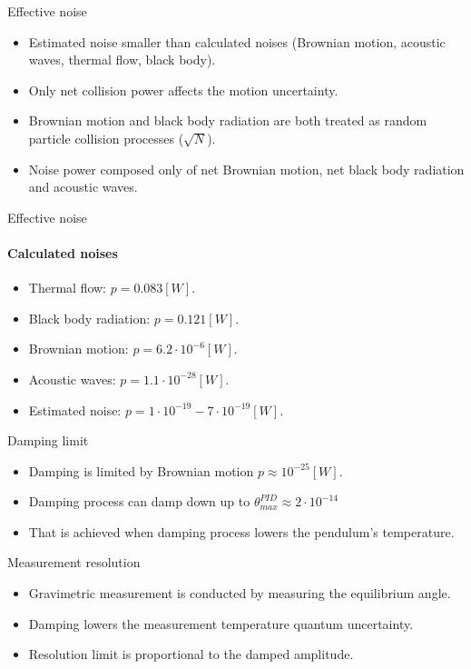 \documentclass{beamer}
\begin{document}
\begin{frame}{Effective noise}
	
	\begin{itemize}	
		\item Estimated noise smaller than calculated noises (Brownian motion, acoustic waves, thermal flow, black body).
		\item Only net collision power affects the motion uncertainty.
		\item Brownian motion and black body radiation are both treated as random particle collision processes ($\sqrt{N}$).
		\item Noise power composed only of net Brownian motion, net black body radiation and acoustic waves.  	 
					
	\end{itemize}
\end{frame}

\begin{frame}{Effective noise}
	\framesubtitle{Calculated noises}
	\begin{itemize}	
		\item Thermal flow: $p=0.083[W]$.
		\item Black body radiation: $p=0.121[W]$.
		\item Brownian motion: $p=6.2\cdot 10^{-6}[W]$.
		\item Acoustic waves: $p=1.1\cdot 10^{-28}[W]$.
		\pause
		\item Estimated noise: $p=1\cdot 10^{-19} - 7\cdot 10^{-19}[W]$.
					
	\end{itemize}
\end{frame}
\begin{frame}{Damping limit}
	
	\begin{itemize}	 
		\item Damping is limited by Brownian motion $p\approx 10^{-25}  [W]$.
		\item Damping process can damp down up to $\theta_{max}^{PID}\approx 2\cdot 10^{-14}$
		\item That is achieved when damping process lowers the pendulum's temperature.  				
	\end{itemize}
\end{frame}
\begin{frame}{Measurement resolution}
	
	\begin{itemize}	 
		\item Gravimetric measurement is conducted by measuring the equilibrium angle.
		\item Damping lowers the measurement temperature quantum uncertainty.
		\item Resolution limit is proportional to the damped amplitude. 				
	\end{itemize}
\end{frame}
\end{document}
